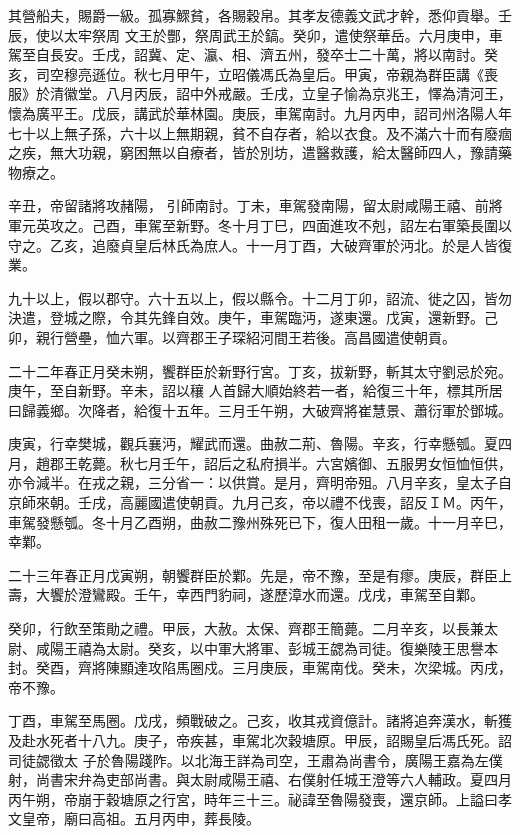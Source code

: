 \begin{pinyinscope}
 其營船夫，賜爵一級。孤寡鰥貧，各賜穀帛。其孝友德義文武才幹，悉仰貢舉。壬辰，使以太牢祭周
 文王於酆，祭周武王於鎬。癸卯，遣使祭華岳。六月庚申，車駕至自長安。壬戌，詔冀、定、瀛、相、濟五州，發卒士二十萬，將以南討。癸亥，司空穆亮遜位。秋七月甲午，立昭儀馮氏為皇后。甲寅，帝親為群臣講《喪服》於清徽堂。八月丙辰，詔中外戒嚴。壬戌，立皇子愉為京兆王，懌為清河王，懷為廣平王。戊辰，講武於華林園。庚辰，車駕南討。九月丙申，詔司州洛陽人年七十以上無子孫，六十以上無期親，貧不自存者，給以衣食。及不滿六十而有廢痼之疾，無大功親，窮困無以自療者，皆於別坊，遣醫救護，給太醫師四人，豫請藥物療之。



 辛丑，帝留諸將攻赭陽，
 引師南討。丁未，車駕發南陽，留太尉咸陽王禧、前將軍元英攻之。己酉，車駕至新野。冬十月丁巳，四面進攻不剋，詔左右軍築長圍以守之。乙亥，追廢貞皇后林氏為庶人。十一月丁酉，大破齊軍於沔北。於是人皆復業。



 九十以上，假以郡守。六十五以上，假以縣令。十二月丁卯，詔流、徙之囚，皆勿決遣，登城之際，令其先鋒自效。庚午，車駕臨沔，遂東還。戊寅，還新野。己卯，親行營壘，恤六軍。以齊郡王子琛紹河間王若後。高昌國遣使朝貢。



 二十二年春正月癸未朔，饗群臣於新野行宮。丁亥，拔新野，斬其太守劉忌於宛。庚午，至自新野。辛未，詔以穰
 人首歸大順始終若一者，給復三十年，標其所居曰歸義鄉。次降者，給復十五年。三月壬午朔，大破齊將崔慧景、蕭衍軍於鄧城。



 庚寅，行幸樊城，觀兵襄沔，耀武而還。曲赦二荊、魯陽。辛亥，行幸懸瓠。夏四月，趙郡王乾薨。秋七月壬午，詔后之私府損半。六宮嬪御、五服男女恒恤恒供，亦令減半。在戎之親，三分省一：以供賞。是月，齊明帝殂。八月辛亥，皇太子自京師來朝。壬戌，高麗國遣使朝貢。九月己亥，帝以禮不伐喪，詔反ＩＭ。丙午，車駕發懸瓠。冬十月乙酉朔，曲赦二豫州殊死已下，復人田租一歲。十一月辛巳，幸鄴。



 二十三年春正月戊寅朔，朝饗群臣於鄴。先是，帝不豫，至是有瘳。庚辰，群臣上壽，大饗於澄鸞殿。壬午，幸西門豹祠，遂歷漳水而還。戊戌，車駕至自鄴。



 癸卯，行飲至策勛之禮。甲辰，大赦。太保、齊郡王簡薨。二月辛亥，以長兼太尉、咸陽王禧為太尉。癸亥，以中軍大將軍、彭城王勰為司徒。復樂陵王思譽本封。癸酉，齊將陳顯達攻陷馬圈戍。三月庚辰，車駕南伐。癸未，次梁城。丙戌，帝不豫。



 丁酉，車駕至馬圈。戊戌，頻戰破之。己亥，收其戎資億計。諸將追奔漢水，斬獲及赴水死者十八九。庚子，帝疾甚，車駕北次穀塘原。甲辰，詔賜皇后馮氏死。詔司徒勰徵太
 子於魯陽踐阼。以北海王詳為司空，王肅為尚書令，廣陽王嘉為左僕射，尚書宋弁為吏部尚書。與太尉咸陽王禧、右僕射任城王澄等六人輔政。夏四月丙午朔，帝崩于穀塘原之行宮，時年三十三。祕諱至魯陽發喪，還京師。上謚曰孝文皇帝，廟曰高祖。五月丙申，葬長陵。




\end{pinyinscope}
